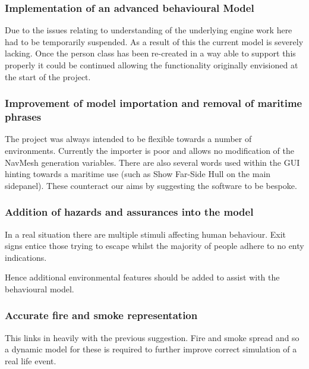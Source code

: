 \subsubsection*{Implementation of an advanced behavioural Model}

Due to the issues relating to understanding of the underlying engine
work here had to be temporarily suspended. As a result of this the
current model is severely lacking. Once the person class has been
re-created in a way able to support this properly it could be continued
allowing the functionality originally envisioned at the start of the
project.


\subsubsection*{Improvement of model importation and removal of maritime phrases}

The project was always intended to be flexible towards a number of
environments. Currently the importer is poor and allows no modification
of the NavMesh generation variables. There are also several words
used within the GUI hinting towards a maritime use (such as Show Far-Side
Hull on the main sidepanel). These counteract our aims by suggesting
the software to be bespoke.


\subsubsection*{Addition of hazards and assurances into the model}

In a real situation there are multiple stimuli affecting human behaviour.
Exit signs entice those trying to escape whilst the majority of people
adhere to no enty indications.

Hence additional environmental features should be added to assist
with the behavioural model.


\subsubsection*{Accurate fire and smoke representation}

This links in heavily with the previous suggestion. Fire and smoke
spread and so a dynamic model for these is required to further improve
correct simulation of a real life event.

